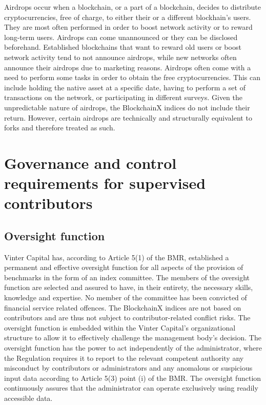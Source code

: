\documentclass{article}
\begin{document}
Airdrops occur when a blockchain, or a part of a blockchain, decides to
distribute cryptocurrencies, free of charge, to either their or a
different blockhain's users. They are most often performed in order to
boost network activity or to reward long-term users. Airdrops can come
unannounced or they can be disclosed beforehand. Established blockchains
that want to reward old users or boost network activity tend to not
announce airdrops, while new networks often announce their airdrops due
to marketing reasons. Airdrops often come with a need to perform some
tasks in order to obtain the free cryptocurrencies. This can include
holding the native asset at a specific date, having to perform a set of
transactions on the network, or participating in different surveys.
Given the unpredictable nature of airdrops, the BlockchainX indices do
not include their return. However, certain airdrops are technically and
structurally equivalent to forks and therefore treated as such.

\section{Governance and control requirements for supervised
contributors}\label{governance-and-control-requirements-for-supervised-contributors}

\subsection{Oversight function}\label{oversight-function}

Vinter Capital has, according to Article 5(1) of the BMR, established a
permanent and effective oversight function for all aspects of the
provision of benchmarks in the form of an index committee. The members
of the oversight function are selected and assured to have, in their
entirety, the necessary skills, knowledge and expertise. No member of
the committee has been convicted of financial service related offences.
The BlockchainX indices are not based on contributors and are thus not
subject to contributor-related conflict risks. The oversight function is
embedded within the Vinter Capital's organizational structure to allow
it to effectively challenge the management body's decision. The
oversight function has the power to act independently of the
administrator, where the Regulation requires it to report to the
relevant competent authority any misconduct by contributors or
administrators and any anomalous or suspicious input data according to
Article 5(3) point (i) of the BMR. The oversight function continuously
assures that the administrator can operate exclusively using readily
accessible data.
\end{document}
